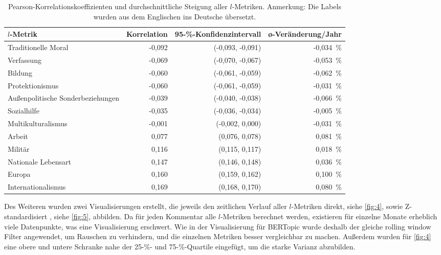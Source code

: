 \begin{table}
    \centering
    \begin{tabular}[c]{lrrr}
        \hline
        \(l\)-Metrik & Korrelation & 95-\%-Konfidenzintervall & \o-Veränderung/Jahr\footnotemark \\
        \hline
        \hline
        Traditionelle Moral & -0,092 & (-0,093, -0,091) & -0,034~\% \\
        Verfassung & -0,069 & (-0,070, -0,067) & -0,053~\% \\
        Bildung & -0,060 & (-0,061, -0,059) & -0,062~\% \\
        Protektionismus & -0,060 & (-0,061, -0,059) & -0,031~\% \\
        Außenpolitische Sonderbeziehungen & -0,039 & (-0,040, -0,038) & -0,066~\% \\
        Sozialhilfe & -0,035 & (-0,036, -0,034) & -0,005~\% \\
        Multikulturalismus & -0,001 & (-0,002, 0,000) & -0,031~\% \\
        Arbeit & 0,077 & (0,076, 0,078) & 0,081~\% \\
        Militär & 0,116 & (0,115, 0,117) & 0,018~\% \\
        Nationale Lebensart & 0,147 & (0,146, 0,148) & 0,036~\% \\
        Europa & 0,160 & (0,159, 0,162) & 0,100~\% \\
        Internationalismus & 0,169 & (0,168, 0,170) & 0,080~\% \\
        \hline
    \end{tabular}
    \caption{Pearson-Korrelationskoeffizienten und durchschnittliche Steigung aller \(l\)-Metriken. Anmerkung: Die Labels wurden aus dem Englischen ins Deutsche übersetzt.}
    \label{tab:3}
\end{table}

Des Weiteren wurden zwei Visualisierungen erstellt, die jeweils den zeitlichen Verlauf aller \(l\)-Metriken direkt, siehe \autoref{fig:4}, sowie Z-standardisiert \autocite{BD07}, siehe \autoref{fig:5}, abbilden.
Da für jeden Kommentar alle \(l\)-Metriken berechnet werden, existieren für einzelne Monate erheblich viele Datenpunkte, was eine Visualisierung erschwert.
Wie in der Visualisierung für BERTopic wurde deshalb der gleiche rolling window Filter angewendet, um Rauschen zu verhindern, und die einzelnen Metriken besser vergleichbar zu machen.
Außerdem wurden für \autoref{fig:4} eine obere und untere Schranke nahe der 25-\%- und 75-\%-Quartile eingefügt, um die starke Varianz abzubilden.

